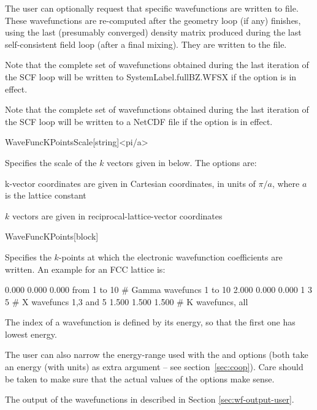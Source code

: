The user can optionally request that specific wavefunctions are
written to file. These wavefunctions are re-computed after the
geometry loop (if any) finishes, using the last (presumably converged)
density matrix produced during the last self-consistent field loop
(after a final mixing). They are written to the
 file.

Note that the complete set of wavefunctions obtained during the last
iteration of the SCF loop will be written to SystemLabel.fullBZ.WFSX
if the  option is in effect.

Note that the complete set of wavefunctions obtained during the last
iteration of the SCF loop will be written to a NetCDF file
 if the  option is in effect.

\begin{fdfentry}{WaveFuncKPointsScale}[string]<pi/a>
  
  Specifies the scale of the $k$ vectors given in
   below.  The options are:
  \begin{fdfoptions}
    \option[pi/a]%
    k-vector coordinates are given in Cartesian coordinates, in units
    of $\pi/a$, where $a$ is the lattice constant

    \option[ReciprocalLatticeVectors]%
    $k$ vectors are given in reciprocal-lattice-vector coordinates

  \end{fdfoptions}

\end{fdfentry}

\begin{fdfentry}{WaveFuncKPoints}[block]
  
  Specifies the $k$-points at which the electronic wavefunction
  coefficients are written.  An example for an FCC lattice is:
  \begin{fdfexample}
     0.000  0.000  0.000  from 1 to 10   # Gamma wavefuncs 1 to 10
     2.000  0.000  0.000  1 3 5          # X wavefuncs 1,3 and 5
     1.500  1.500  1.500                 # K wavefuncs, all
  \end{fdfexample}
  The index of a wavefunction is defined by its energy, so that the
  first one has lowest energy.

  The user can also narrow the energy-range used with the
   and  options (both take
  an energy (with units) as extra argument -- see
  section~\ref{sec:coop}). Care should be taken to make sure that the
  actual values of the options make sense.

  The output of the wavefunctions in described in Section
  \ref{sec:wf-output-user}.

\end{fdfentry}


